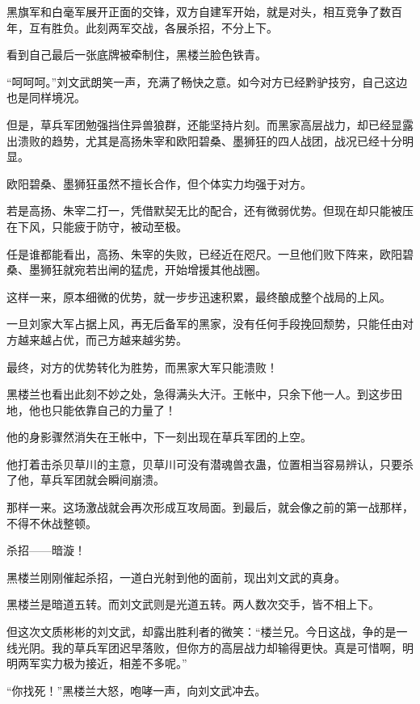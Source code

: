
\begin{this_body}

黑旗军和白毫军展开正面的交锋，双方自建军开始，就是对头，相互竞争了数百年，互有胜负。此刻两军交战，各展杀招，不分上下。

看到自己最后一张底牌被牵制住，黑楼兰脸色铁青。

“呵呵呵。”刘文武朗笑一声，充满了畅快之意。如今对方已经黔驴技穷，自己这边也是同样境况。

但是，草兵军团勉强挡住异兽狼群，还能坚持片刻。而黑家高层战力，却已经显露出溃败的趋势，尤其是高扬朱宰和欧阳碧桑、墨狮狂的四人战团，战况已经十分明显。

欧阳碧桑、墨狮狂虽然不擅长合作，但个体实力均强于对方。

若是高扬、朱宰二打一，凭借默契无比的配合，还有微弱优势。但现在却只能被压在下风，只能疲于防守，被动至极。

任是谁都能看出，高扬、朱宰的失败，已经近在咫尺。一旦他们败下阵来，欧阳碧桑、墨狮狂就宛若出闸的猛虎，开始增援其他战圈。

这样一来，原本细微的优势，就一步步迅速积累，最终酿成整个战局的上风。

一旦刘家大军占据上风，再无后备军的黑家，没有任何手段挽回颓势，只能任由对方越来越占优，而己方越来越劣势。

最终，对方的优势转化为胜势，而黑家大军只能溃败！

黑楼兰也看出此刻不妙之处，急得满头大汗。王帐中，只余下他一人。到这步田地，他也只能依靠自己的力量了！

他的身影骤然消失在王帐中，下一刻出现在草兵军团的上空。

他打着击杀贝草川的主意，贝草川可没有潜魂兽衣蛊，位置相当容易辨认，只要杀了他，草兵军团就会瞬间崩溃。

那样一来。这场激战就会再次形成互攻局面。到最后，就会像之前的第一战那样，不得不休战整顿。

杀招——暗漩！

黑楼兰刚刚催起杀招，一道白光射到他的面前，现出刘文武的真身。

黑楼兰是暗道五转。而刘文武则是光道五转。两人数次交手，皆不相上下。

但这次文质彬彬的刘文武，却露出胜利者的微笑：“楼兰兄。今日这战，争的是一线光阴。我的草兵军团迟早落败，但你方的高层战力却输得更快。真是可惜啊，明明两军实力极为接近，相差不多呢。”

“你找死！”黑楼兰大怒，咆哮一声，向刘文武冲去。


\end{this_body}

